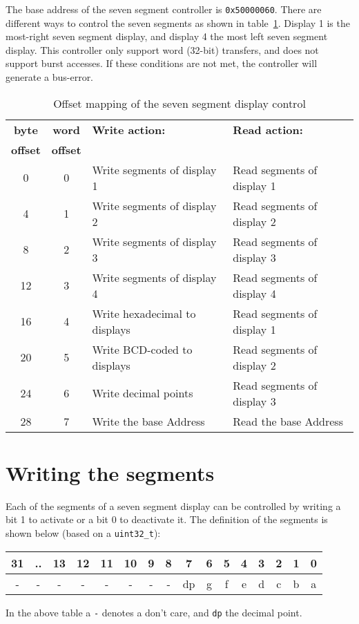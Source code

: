 \documentclass[a4paper,twoside,12pt]{article}
\begin{document}
The base address of the seven segment controller is \texttt{0x50000060}. There are different ways to control the seven segments as shown in table~\ref{tab:sevensegs}. Display 1 is the most-right seven segment display, and display 4 the most left seven segment display. This controller only support word (32-bit) transfers, and does not support burst accesses. If these conditions are not met, the controller will
generate a bus-error.
\begin{table}
\begin{tabular}{|c|c|l|l|}
\hline
\textbf{byte}&\textbf{word}&\textbf{Write action:}&\textbf{Read action:}\\
\textbf{offset}&\textbf{offset}&&\\
\hline
\hline
0&0&Write segments of display 1&Read segments of display 1\\
\hline
4&1&Write segments of display 2&Read segments of display 2\\
\hline
8&2&Write segments of display 3&Read segments of display 3\\
\hline
12&3&Write segments of display 4&Read segments of display 4\\
\hline
16&4&Write hexadecimal to displays&Read segments of display 1\\
\hline
20&5&Write BCD-coded to displays&Read segments of display 2\\
\hline
24&6&Write decimal points&Read segments of display 3\\
\hline
28&7&Write the base Address&Read the base Address\\
\hline
\end{tabular}
\caption{Offset mapping of the seven segment display control}
\label{tab:sevensegs}
\end{table}
\section{Writing the segments}
Each of the segments of a seven segment display can be controlled by writing a bit 1 to activate or a bit 0 to deactivate it. The definition of the segments is shown below (based on a \texttt{uint32\_t}):
\begin{center}
\begin{tabular}{|c|c|c|c|c|c|c|c|c|c|c|c|c|c|c|c|}
\hline
31&..&13&12&11&10&9&8&7&6&5&4&3&2&1&0\\
\hline
\hline
-&-&-&-&-&-&-&-&dp&g&f&e&d&c&b&a\\
\hline
\end{tabular}
\end{center}
In the above table a \texttt{-} denotes a don't care, and \texttt{dp} the decimal point.
\end{document}
